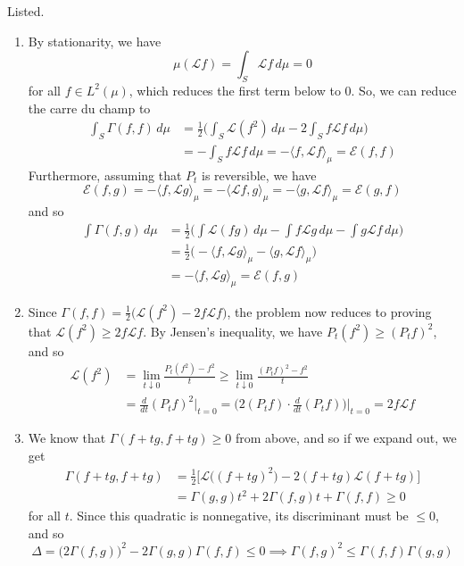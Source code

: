 \documentclass{article}
\begin{document}
  \begin{solution}
  Listed. 
  \begin{enumerate}
      \item By stationarity, we have 
      \[\mu ( \mathscr{L} f) = \int_S \mathscr{L} f \, d\mu = 0\]
      for all $f \in L^2 (\mu)$, which reduces the first term below to $0$. So, we can reduce the carre du champ to 
      \begin{align*}
          \int_S \Gamma(f, f) \, d\mu & = \frac{1}{2} \bigg( \int_S \mathscr{L} (f^2) \, d\mu - 2 \int_S f \mathscr{L} f \, d\mu \bigg) \\
          & = - \int_S f \mathscr{L} f \, d\mu = - \langle f, \mathscr{L} f \rangle_\mu = \mathcal{E}(f, f)
      \end{align*}
      Furthermore, assuming that $P_t$ is reversible, we have 
      \[\mathcal{E}(f, g) = - \langle f, \mathscr{L} g \rangle_\mu = -\langle \mathscr{L} f, g \rangle_\mu = - \langle g, \mathscr{L} f \rangle_\mu = \mathcal{E}(g, f)\]
      and so 
      \begin{align*}
          \int \Gamma (f, g) \, d\mu & = \frac{1}{2} \bigg( \int \mathscr{L}(f g) \, d\mu - \int f \mathscr{L} g \, d\mu - \int g \mathscr{L} f \, d\mu \bigg) \\
          & = \frac{1}{2} \big( - \langle f, \mathscr{L} g \rangle_\mu - \langle g, \mathscr{L} f\rangle_\mu \big) \\
          & = - \langle f, \mathscr{L} g \rangle_\mu = \mathcal{E}(f, g)
      \end{align*}
      
      \item Since $\Gamma(f, f) = \frac{1}{2} \big( \mathscr{L} (f^2) - 2 f \mathscr{L}f \big)$, the problem now reduces to proving that $\mathscr{L} (f^2) \geq 2 f \mathscr{L}f$. By Jensen's inequality, we have $P_t (f^2) \geq (P_t f)^2$, and so 
      \begin{align*}
          \mathscr{L}(f^2) & = \lim_{t \downarrow 0} \frac{P_t (f^2) - f^2}{t} \geq \lim_{t \downarrow 0} \frac{(P_t f)^2 - f^2}{t} \\
          & = \frac{d}{dt} (P_t f)^2 \bigg|_{t = 0} = \bigg( 2 (P_t f) \cdot \frac{d}{dt} (P_t f) \bigg)\bigg|_{t = 0} = 2 f \mathscr{L} f
      \end{align*}
      
      \item We know that $\Gamma(f + t g, f + tg) \geq 0$ from above, and so if we expand out, we get
      \begin{align*}
          \Gamma(f + t g, f + tg) & = \frac{1}{2} \Big[ \mathscr{L} \big( (f + t g)^2 \big) - 2 (f + t g) \mathscr{L}(f + t g) \Big] \\
          & = \Gamma(g, g) t^2 + 2 \Gamma (f, g) t + \Gamma(f, f) \geq 0 
      \end{align*}
      for all $t$. Since this quadratic is nonnegative, its discriminant must be $\leq 0$, and so 
      \[\Delta = \big( 2 \Gamma (f, g) \big)^2 - 2 \Gamma(g, g) \Gamma(f, f) \leq 0 \implies \Gamma(f, g)^2 \leq \Gamma(f, f) \Gamma(g, g)\]
      

\end{enumerate}
\end{solution}
\end{document}
